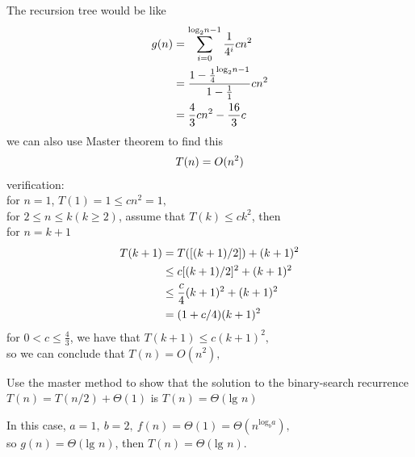 \documentclass[12pt, a4paper, UTF8]{ctexart}
\begin{document}
\begin{solution}
  The recursion tree would be like\\
  \begin{align}
  g(n) & = \sum_{i = 0}^{\text{log}_{2}n - 1} \frac{1}{4^{i}}cn^{2} \notag \\
       & = \frac{1 - \frac{1}{4}^{\text{log}_{2}n - 1}}{1 - \frac{1}{1}}cn^{2} \notag \\
       & = \frac{4}{3}cn^{2} - \frac{16}{3}c \notag 
  \end{align}
  we can also use Master theorem to find this
  \begin{align}
      T(n) = O(n^{2}) \notag
  \end{align}
  verification:\\
  for $n = 1$, $T(1) = 1 \leq cn^{2} = 1,$\\
  for $2 \leq n \leq k(k \geq 2)$, assume that $T(k) \leq ck^{2}$, then\\
  for $n = k + 1$
  \begin{align}
      T(k + 1) & = T([(k + 1)/2]) + (k + 1)^{2} \notag \\
               & \leq c[(k + 1)/2]^{2} + (k + 1)^{2} \notag \\
               & \leq \frac{c}{4}(k + 1)^{2} + (k + 1)^{2} \notag \\
               & = (1 + c/4)(k + 1)^{2} \notag
  \end{align}
  for $0 < c \leq \frac{4}{3}$, we have that $T(k + 1) \leq c(k + 1)^{2},$\\
  so we can conclude that $T(n) = O(n^{2}),$\\
\end{solution}

\begin{problem}[TC: exercise 4.5-3]
  Use the master method to show that the solution to the binary-search recurrence 
  $T(n) = T(n/2) + \Theta(1)$ is $T(n) = \Theta(\text{lg }n)$
\end{problem}

\begin{solution}
  In this case, $a = 1,~b = 2,~f(n) = \Theta(1) = \Theta(n^{\text{log}_{b}a}),$\\
  so $g(n) = \Theta(\text{lg }n)$, then $T(n) = \Theta(\text{lg }n)$.
\end{solution}
\end{document}
